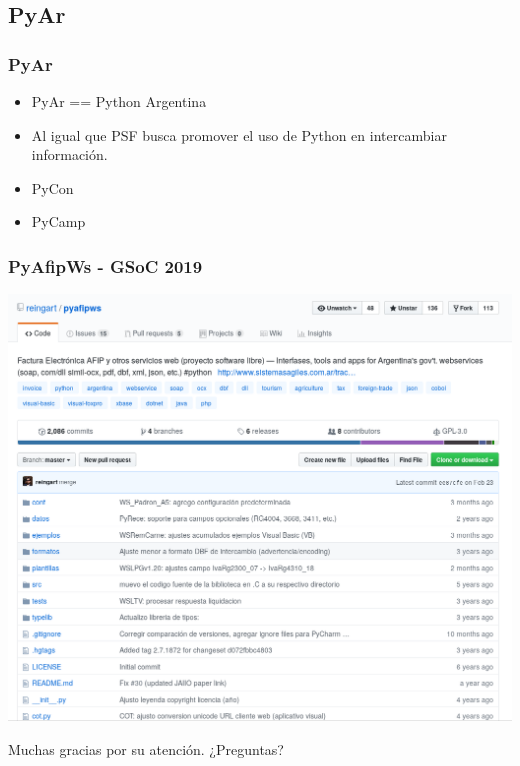 \documentclass[spanish]{beamer}
\begin{document}
\subsection{PyAr}
\begin{frame}
	\frametitle{PyAr}
	\begin{itemize}
		\item PyAr == Python Argentina
		\item Al igual que PSF busca promover el uso de Python
		en intercambiar información.
		\item PyCon
		\item PyCamp
	\end{itemize}
\end{frame}

\begin{frame}
	\frametitle{PyAfipWs - GSoC 2019}
	\center
	\includegraphics[width=1\linewidth]{pyafip.png}
\end{frame}

\begin{frame}
	\center
	{\LARGE Muchas gracias por su atención.}
	\newline
	\newline
	\newline
	¿Preguntas?
\end{frame}
\end{document}
